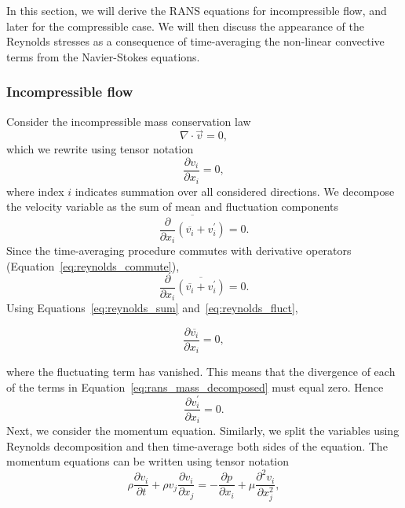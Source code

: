 In this section, we will derive the RANS equations for incompressible flow, and later for the compressible case. We will then discuss the appearance of the Reynolds stresses as a consequence of time-averaging the non-linear convective terms from the Navier-Stokes equations.

\subsubsection{Incompressible flow}

Consider the incompressible mass conservation law
\begin{equation}
    \nabla\cdot\vec{v} = 0,
\end{equation}
which we rewrite using tensor notation
\begin{equation}
    \frac{\partial v_i}{\partial x_i} = 0,
\end{equation}
where index $i$ indicates summation over all considered directions. We decompose the velocity variable as the sum of mean and fluctuation components
\begin{equation}
    \overline{\frac{\partial }{\partial x_i}\left(\overline{v_i} + v_i^\prime\right)} = 0.
\end{equation}
Since the time-averaging procedure commutes with derivative operators (Equation~\ref{eq:reynolds_commute}),
\begin{equation}
    \label{eq:rans_mass_decomposed}
    \frac{\partial}{\partial x_i} \overline{\left(\overline{v_i} + v_i^\prime\right)} = 0.
\end{equation}
Using Equations~\ref{eq:reynolds_sum} and~\ref{eq:reynolds_fluct},
\begin{eqBox}
\begin{equation}
	\frac{\partial \overline{v_i}}{\partial x_i} = 0,
	\label{eq:rans_continuity}
\end{equation}
\end{eqBox}
where the fluctuating term has vanished. This means that the divergence of each of the terms in Equation~\ref{eq:rans_mass_decomposed} must equal zero. Hence
\begin{equation}
	\frac{\partial v_i^\prime}{\partial x_i} = 0.
	\label{eq:rans_continuity2}
\end{equation}
Next, we consider the momentum equation. Similarly, we split the variables using Reynolds decomposition and then time-average both sides of the equation. The momentum equations can be written using tensor notation
\begin{equation}
    \label{eq:rans_momentum_initial}
    \rho\frac{\partial v_i}{\partial t} + \rho v_j\frac{\partial v_i}{\partial x_j} =
    - \frac{\partial p}{\partial x_i} + \mu \frac{\partial^2 v_i}{\partial x_j^2},
\end{equation}
